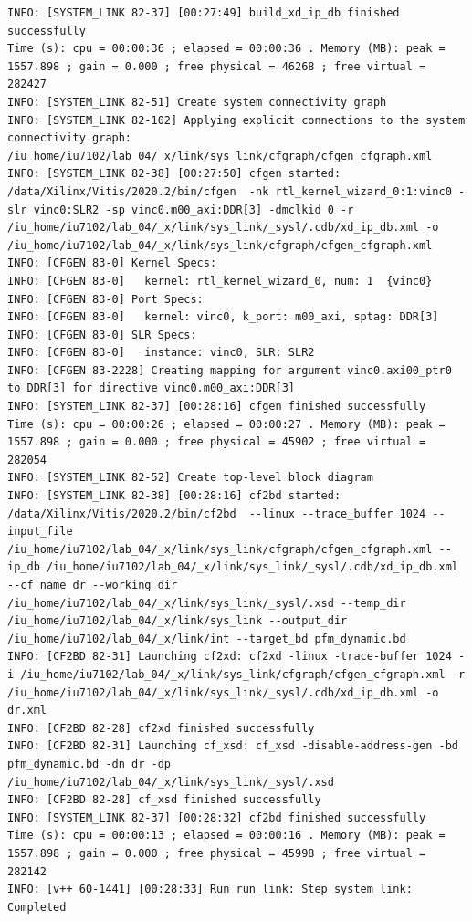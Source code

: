 \begin{lstlisting}[label=code, basicstyle=\tiny, caption=Листинг файла v++\_vinc.log]
INFO: [SYSTEM_LINK 82-37] [00:27:49] build_xd_ip_db finished successfully
Time (s): cpu = 00:00:36 ; elapsed = 00:00:36 . Memory (MB): peak = 1557.898 ; gain = 0.000 ; free physical = 46268 ; free virtual = 282427
INFO: [SYSTEM_LINK 82-51] Create system connectivity graph
INFO: [SYSTEM_LINK 82-102] Applying explicit connections to the system connectivity graph: /iu_home/iu7102/lab_04/_x/link/sys_link/cfgraph/cfgen_cfgraph.xml
INFO: [SYSTEM_LINK 82-38] [00:27:50] cfgen started: /data/Xilinx/Vitis/2020.2/bin/cfgen  -nk rtl_kernel_wizard_0:1:vinc0 -slr vinc0:SLR2 -sp vinc0.m00_axi:DDR[3] -dmclkid 0 -r /iu_home/iu7102/lab_04/_x/link/sys_link/_sysl/.cdb/xd_ip_db.xml -o /iu_home/iu7102/lab_04/_x/link/sys_link/cfgraph/cfgen_cfgraph.xml
INFO: [CFGEN 83-0] Kernel Specs: 
INFO: [CFGEN 83-0]   kernel: rtl_kernel_wizard_0, num: 1  {vinc0}
INFO: [CFGEN 83-0] Port Specs: 
INFO: [CFGEN 83-0]   kernel: vinc0, k_port: m00_axi, sptag: DDR[3]
INFO: [CFGEN 83-0] SLR Specs: 
INFO: [CFGEN 83-0]   instance: vinc0, SLR: SLR2
INFO: [CFGEN 83-2228] Creating mapping for argument vinc0.axi00_ptr0 to DDR[3] for directive vinc0.m00_axi:DDR[3]
INFO: [SYSTEM_LINK 82-37] [00:28:16] cfgen finished successfully
Time (s): cpu = 00:00:26 ; elapsed = 00:00:27 . Memory (MB): peak = 1557.898 ; gain = 0.000 ; free physical = 45902 ; free virtual = 282054
INFO: [SYSTEM_LINK 82-52] Create top-level block diagram
INFO: [SYSTEM_LINK 82-38] [00:28:16] cf2bd started: /data/Xilinx/Vitis/2020.2/bin/cf2bd  --linux --trace_buffer 1024 --input_file /iu_home/iu7102/lab_04/_x/link/sys_link/cfgraph/cfgen_cfgraph.xml --ip_db /iu_home/iu7102/lab_04/_x/link/sys_link/_sysl/.cdb/xd_ip_db.xml --cf_name dr --working_dir /iu_home/iu7102/lab_04/_x/link/sys_link/_sysl/.xsd --temp_dir /iu_home/iu7102/lab_04/_x/link/sys_link --output_dir /iu_home/iu7102/lab_04/_x/link/int --target_bd pfm_dynamic.bd
INFO: [CF2BD 82-31] Launching cf2xd: cf2xd -linux -trace-buffer 1024 -i /iu_home/iu7102/lab_04/_x/link/sys_link/cfgraph/cfgen_cfgraph.xml -r /iu_home/iu7102/lab_04/_x/link/sys_link/_sysl/.cdb/xd_ip_db.xml -o dr.xml
INFO: [CF2BD 82-28] cf2xd finished successfully
INFO: [CF2BD 82-31] Launching cf_xsd: cf_xsd -disable-address-gen -bd pfm_dynamic.bd -dn dr -dp /iu_home/iu7102/lab_04/_x/link/sys_link/_sysl/.xsd
INFO: [CF2BD 82-28] cf_xsd finished successfully
INFO: [SYSTEM_LINK 82-37] [00:28:32] cf2bd finished successfully
Time (s): cpu = 00:00:13 ; elapsed = 00:00:16 . Memory (MB): peak = 1557.898 ; gain = 0.000 ; free physical = 45998 ; free virtual = 282142
INFO: [v++ 60-1441] [00:28:33] Run run_link: Step system_link: Completed

\end{lstlisting}
